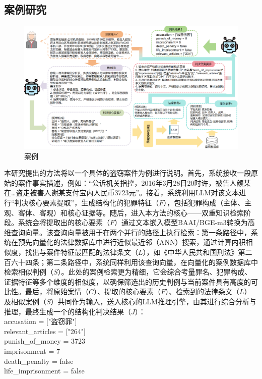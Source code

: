 \subsection{\heiti 案例研究}
\begin{figure}[htpb]
    \centering
    \includegraphics[width=0.8\linewidth]{fig/case.pdf}
    \caption{案例}
    \label{fig:case}
\end{figure}
本研究提出的方法将以一个具体的盗窃案件为例进行说明。首先，系统接收一段原始的案件事实描述，例如：“公诉机关指控，2016年3月28日20时许，被告人颜某在…盗走被害人谢某支付宝内人民币3723元”。接着，系统利用LLM对该文本进行“判决核心要素提取”，生成结构化的犯罪特征（$F$），包括犯罪构成（主体、主观、客体、客观）和核心证据等。随后，进入本方法的核心——双重知识检索阶段。系统会将提取出的核心要素（$F$）通过文本嵌入模型BAAI/BGE-m3转换为高维查询向量。该查询向量被用于在两个并行的路径上执行检索：第一条路径中，系统在预先向量化的法律数据库中进行近似最近邻（ANN）搜索，通过计算内积相似度，找出与案件特征最匹配的法律条文（$L$），如《中华人民共和国刑法》第二百六十四条；第二条路径中，系统同样利用该查询向量，在向量化的案例数据库中检索相似判例（$S$）。此处的案例检索更为精细，它会综合考量罪名、犯罪构成、证据特征等多个维度的相似度，以确保筛选出的历史判例与当前案件具有高度的可比性。最后，将原始案情（$C$）、提取的核心要素（$F$）、检索到的法律条文（$L$）及相似案例（$S$）共同作为输入，送入核心的LLM推理引擎，由其进行综合分析与推理，最终生成一个的结构化判决结果（$J$）：
\\
accusation = ["盗窃罪"]
\\
relevant\_articles = ["264"]
\\
punish\_of\_money = 3723
\\
imprisonment = 7
\\
death\_penalty = false
\\
life\_imprisonment = false

